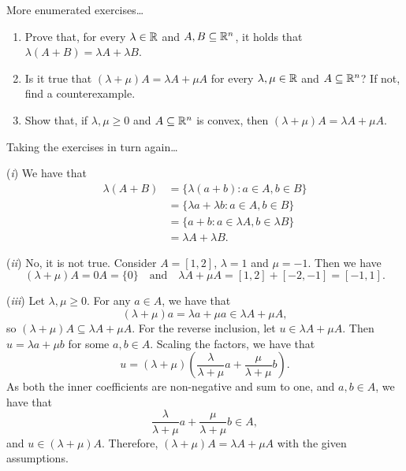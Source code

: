 \begin{exercise}
  More enumerated exercises\dots

  \begin{enumerate}[label = (\emph{\roman*})]
    \item Prove that, for every $\lambda \in \mathbb{R}$ and $A, B \subseteq \mathbb{R}^n$, it holds that $\lambda(A + B) = \lambda A + \lambda B$.

    \item Is it true that $(\lambda + \mu) A = \lambda A + \mu A$ for every $\lambda, \mu \in \mathbb{R}$ and $A \subseteq \mathbb{R}^n$?
      If not, find a counterexample.

    \item Show that, if $\lambda, \mu \geq 0$ and $A \subseteq \mathbb{R}^n$ is convex, then $(\lambda + \mu) A = \lambda A + \mu A$.
  \end{enumerate}
\end{exercise}

\begin{solution}
  Taking the exercises in turn again\dots

  (\emph{i}) We have that
  \begin{align*}
    \lambda (A + B) &= \{ \lambda (a + b) : a \in A, b \in B \} \\
    &= \{ \lambda a + \lambda b : a \in A, b \in B \} \\
    &= \{ a + b : a \in \lambda A, b \in \lambda B \} \\
    &= \lambda A + \lambda B.
  \end{align*}

  (\emph{ii}) No, it is not true.
  Consider $A = [1, 2]$, $\lambda = 1$ and $\mu = -1$.
  Then we have
  \begin{equation}
    (\lambda + \mu) A = 0A = \{ 0 \}
    \quad\text{and}\quad
    \lambda A + \mu A = [1, 2] + [-2, -1] = [-1, 1].
  \end{equation}

  (\emph{iii}) Let $\lambda, \mu \geq 0$.
  For any $a \in A$, we have that
  \begin{equation}
    (\lambda + \mu) a = \lambda a + \mu a \in \lambda A + \mu A,
  \end{equation}
  so $(\lambda + \mu) A \subseteq \lambda A + \mu A$.
  For the reverse inclusion, let $u \in \lambda A + \mu A$.
  Then $u = \lambda a + \mu b$ for some $a, b \in A$.
  Scaling the factors, we have that
  \begin{equation}
    u = (\lambda + \mu) \left(
      \frac{\lambda}{\lambda + \mu} a + \frac{\mu}{\lambda + \mu} b
    \right).
  \end{equation}
  As both the inner coefficients are non-negative and sum to one, and $a, b \in A$, we have that
  \begin{equation}
    \frac{\lambda}{\lambda + \mu} a + \frac{\mu}{\lambda + \mu} b \in A,
  \end{equation}
  and $u \in (\lambda + \mu) A$.
  Therefore, $(\lambda + \mu) A = \lambda A + \mu A$ with the given assumptions.
\end{solution}

